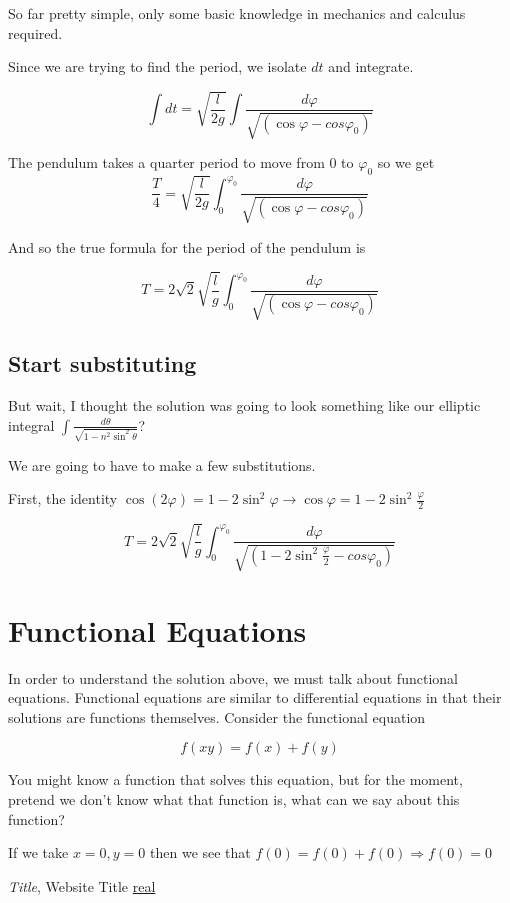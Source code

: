 \documentclass[11pt]{article}
\begin{document}
So far pretty simple, only some basic knowledge in mechanics and calculus required.

\vspace{5mm} Since we are trying to find the period, we isolate $dt$ and integrate.

$$\int dt=\sqrt{\frac{l}{2g}}\int\frac{d\varphi}{\sqrt{(\cos\varphi-cos\varphi_0)}}$$

The pendulum takes a quarter period to move from $0$ to $\varphi_0$ so we get
$$\frac{T}{4}=\sqrt{\frac{l}{2g}}\int_0^{\varphi_0}\frac{d\varphi}{\sqrt{(\cos\varphi-cos\varphi_0)}}$$

And so the true formula for the period of the pendulum is 

$$T=2\sqrt{2}\sqrt{\frac{l}{g}}\int_0^{\varphi_0}\frac{d\varphi}{\sqrt{(\cos\varphi-cos\varphi_0)}}$$

\subsection{Start substituting}

But wait, I thought the solution was going to look something like our elliptic integral
$\int\frac{d\theta}{\sqrt{1-n^2\sin^2\theta}}$?

\vspace{5mm} We are going to have to make a few substitutions.

First, the identity $\cos(2\varphi)=1-2\sin^2\varphi \longrightarrow \cos\varphi=1-2\sin^2\frac{\varphi}{2}$

$$T=2\sqrt{2}\sqrt{\frac{l}{g}}\int_0^{\varphi_0}\frac{d\varphi}{\sqrt{(1-2\sin^2\frac{\varphi}{2}-cos\varphi_0)}}$$

\section{Functional Equations}
In order to understand the solution above, we must talk about functional equations. Functional equations are similar to differential equations in that their solutions are functions themselves. Consider the functional equation

$$f(xy)=f(x)+f(y)$$

You might know a function that solves this equation, but for the moment, pretend we don't know what that function is, what can we say about this function?

\vspace{5mm} If we take $x=0,y=0$ then we see that $f(0)=f(0)+f(0)\Rightarrow f(0)=0$



\begin{thebibliography}{9}

\emph{Title}, Website Title
\url{real}

\end{thebibliography}
\end{document}
